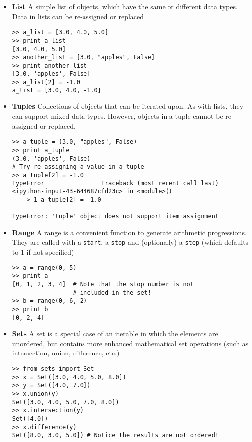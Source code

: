 \begin{itemize}
\item \textbf{List} A simple list of objects, which have the same or different data types. Data in lists can be re-assigned or replaced
\begin{lstlisting}[frame=single]
>> a_list = [3.0, 4.0, 5.0]
>> print a_list
[3.0, 4.0, 5.0]
>> another_list = [3.0, "apples", False]
>> print another_list
[3.0, 'apples', False]
>> a_list[2] = -1.0
a_list = [3.0, 4.0, -1.0]
\end{lstlisting}

\item \textbf{Tuples} Collections of objects that can be iterated upon. As with lists, they can support mixed data types. However, objects in a tuple cannot be re-assigned or replaced.
\begin{lstlisting}[frame=single]
>> a_tuple = (3.0, "apples", False)
>> print a_tuple
(3.0, 'apples', False)
# Try re-assigning a value in a tuple
>> a_tuple[2] = -1.0
TypeError                Traceback (most recent call last)
<ipython-input-43-644687cfd23c> in <module>()
----> 1 a_tuple[2] = -1.0

TypeError: 'tuple' object does not support item assignment
\end{lstlisting}

\item \textbf{Range} A range is a convenient function to generate arithmetic progressions. They are called with a \verb=start=, a \verb=stop= and (optionally) a \verb=step= (which defaults to 1 if not specified)

\begin{lstlisting}[frame=single]
>> a = range(0, 5)
>> print a
[0, 1, 2, 3, 4]  # Note that the stop number is not 
                 # included in the set!  
>> b = range(0, 6, 2)
>> print b
[0, 2, 4]
\end{lstlisting}

\item \textbf{Sets} A set is a special case of an iterable in which the elements are unordered, but contains more enhanced mathematical set operations (such as intersection, union, difference, etc.)

\begin{lstlisting}[frame=single]
>> from sets import Set
>> x = Set([3.0, 4.0, 5.0, 8.0])
>> y = Set([4.0, 7.0])
>> x.union(y)
Set([3.0, 4.0, 5.0, 7.0, 8.0])
>> x.intersection(y)
Set([4.0])
>> x.difference(y)
Set([8.0, 3.0, 5.0]) # Notice the results are not ordered!
\end{lstlisting}
\end{itemize}

